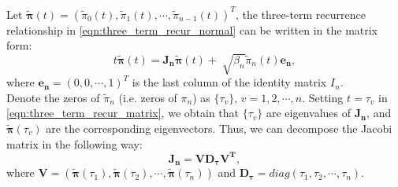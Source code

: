 \documentclass[11pt,letter]{article}
\begin{document}
Let $\bm{\tilde{\pi}}(t)=(\tilde{\pi}_0(t),\tilde{\pi}_1(t),\cdots,\tilde{\pi}_{n-1}(t))^T$, the three-term recurrence relationship in \eqref{eqn:three_term_recur_normal} can be written in the matrix form:
\begin{equation}
\label{eqn:three_term_recur_matrix}
t\bm{\tilde{\pi}}(t)=\mathbf{J_n}\bm{\tilde{\pi}}(t)+\sqrt[]{\beta_n}\tilde{\pi}_n(t)\mathbf{e_n},
\end{equation}
where $\mathbf{e_n}=(0,0,\cdots,1)^T$ is the last column of the identity matrix $I_n$.\\

Denote the zeros of $\tilde{\pi}_n$ (i.e. zeros of $\pi_n$) as $\{\tau_v\}$, $v=1,2,\cdots,n$. Setting $t=\tau_v$ in \eqref{eqn:three_term_recur_matrix}, we obtain that $\{\tau_v\}$ are eigenvalues of $\mathbf{J_n}$, and $\bm{\tilde{\pi}}(\tau_v)$ are the corresponding eigenvectors. Thus, we can decompose the Jacobi matrix in the following way:
\begin{equation}
\label{eqn:decomposition_of_jn}
\mathbf{J_n}=\mathbf{VD_\tau V^T},
\end{equation}
where $\mathbf{V}=(\bm{\tilde{\pi}}(\tau_1),\bm{\tilde{\pi}}(\tau_2),\cdots,\bm{\tilde{\pi}}(\tau_n))$ and $\mathbf{D_\tau}=diag(\tau_1,\tau_2,\cdots,\tau_n)$.\\

\end{document}
